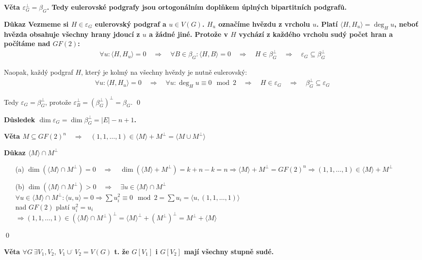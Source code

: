 \documentclass[a4paper,12pt,titlepage]{article}
\newcommand{\dk}{\smallskip\noindent\bf Důkaz\rm{} }
\newcommand{\vt}{\smallskip\noindent\bf Věta\rm{} }
\newcommand{\dsl}{\smallskip\noindent\bf Důsledek\rm{} }
\newcommand{\sk}[1]{\langle #1\rangle}
\begin{document}
\vt $\varepsilon_G^\bot = \beta_G$. Tedy eulerovské podgrafy jsou ortogonálním
doplňkem úplných bipartitních podgrafů.

\dk Vezmeme si $H \in \varepsilon_G$ eulerovský podgraf a $u \in V(G)$. $H_u$
označíme hvězdu z vrcholu $u$. Platí $\sk{H,H_u} = \deg_H u$, neboť hvězda
obsahuje všechny hrany jdoucí z $u$ a žádné jiné. Protože v $H$ vychází z
každého vrcholu sudý počet hran a počítáme nad $GF(2)$:
\begin{align*}
\forall u: \sk{H,H_u} = 0 \quad\Rightarrow\quad \forall B\in \beta_G: \sk{H,B} = 0 \quad\Rightarrow\quad H \in \beta_G^\bot \quad\Rightarrow\quad \varepsilon_G \subseteq \beta_G^\bot
\end{align*}

Naopak, každý podgraf $H$, který je kolmý na všechny hvězdy je nutně eulerovský:
\begin{align*}
\forall u: \sk{H,H_u} = 0 \quad\Rightarrow\quad \forall u: \deg_H u \equiv 0 \mod 2 \quad\Rightarrow\quad H \in \varepsilon_G \quad\Rightarrow\quad \beta_G^\bot \subseteq \varepsilon_G
\end{align*}

Tedy $\varepsilon_G = \beta_G^\bot$, protože $\varepsilon_B^\bot = {\left(\beta_G^\bot\right)}^\bot = \beta_G$.
\qed

\dsl $\dim \varepsilon_G = \dim \beta_G^\bot = |E| - n + 1$.


\vt $M \subseteq GF(2)^n \quad\Rightarrow\quad (1,1,\dots,1) \in \sk M + M^\bot = \sk{M\cup M^\bot}$

\dk $\sk M \cap M^\bot$
\begin{enumerate}
\item[(a)] $\dim(\sk M \cap M^\bot) = 0 \quad\Rightarrow\quad \dim(\sk M + M^\bot) = k+n-k = n \Rightarrow \sk M + M^\bot = GF(2)^n \Rightarrow (1,1,\dots,1)\in \sk M + M^\bot$
\item[(b)] $\dim(\sk M \cap M^\bot) > 0 \quad\Rightarrow\quad \exists u\in \sk M \cap M^\bot$ \\ 
$\forall u\in \sk M \cap M^\bot: \sk{u,u} = 0 \Rightarrow \sum u_i^2 \equiv 0 \mod 2 = \sum u_i = \sk{u, (1,1,\dots,1)}$ \\
nad $GF(2)$ platí $u_i^2 = u_i$ \\
$\Rightarrow (1,1,\dots,1) \in {(\sk M \cap M^\bot)}^\bot = {\sk M}^\bot + {(M^\bot)}^\bot = M^\bot + \sk M$
\end{enumerate}
\qed


\vt $\forall G \ \exists V_1,V_2,\ V_1\cup^\cdot V_2 = V(G)$ t. že $G[V_1]$ i $G[V_2]$ mají všechny stupně sudé.
\end{document}
